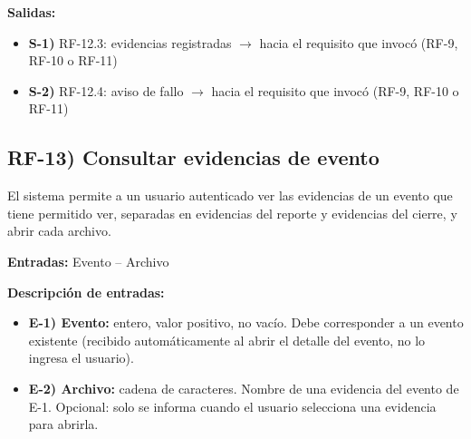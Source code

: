 \textbf{Salidas:}
\begin{itemize}[label={}, leftmargin=1.5em]
  \item \textbf{S-1)} RF-12.3: evidencias registradas $\rightarrow$ hacia el requisito que invoc\'o (RF-9, RF-10 o RF-11)
  \item \textbf{S-2)} RF-12.4: aviso de fallo $\rightarrow$ hacia el requisito que invoc\'o (RF-9, RF-10 o RF-11)
\end{itemize}

\subsection*{RF-13) Consultar evidencias de evento}
El sistema permite a un usuario autenticado ver las evidencias de un evento que tiene permitido ver, separadas en evidencias del reporte y evidencias del cierre, y abrir cada archivo.

\textbf{Entradas:} Evento -- Archivo

\textbf{Descripci\'on de entradas:}
\begin{itemize}[label={}, leftmargin=1.5em]
  \item \textbf{E-1) Evento:} entero, valor positivo, no vac\'io. Debe corresponder a un evento existente (recibido autom\'aticamente al abrir el detalle del evento, no lo ingresa el usuario).
  \item \textbf{E-2) Archivo:} cadena de caracteres. Nombre de una evidencia del evento de E-1. Opcional: solo se informa cuando el usuario selecciona una evidencia para abrirla.
\end{itemize}

